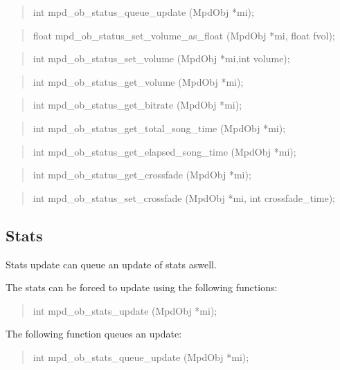 \documentclass[a4paper,11pt]{article}
\begin{document}
	\begin{quote}
	int   mpd\_ob\_status\_queue\_update  (MpdObj *mi);
	\end{quote}
	
	\begin{quote}
	float   mpd\_ob\_status\_set\_volume\_as\_float (MpdObj *mi, float fvol);
	\end{quote}
	
	\begin{quote}
	int   mpd\_ob\_status\_set\_volume  (MpdObj *mi,int volume);
	\end{quote}
	
	\begin{quote}
	int   mpd\_ob\_status\_get\_volume  (MpdObj *mi);
	\end{quote}
	
	\begin{quote}
	int   mpd\_ob\_status\_get\_bitrate  (MpdObj *mi);
	\end{quote}
	
	\begin{quote}
	int  mpd\_ob\_status\_get\_total\_song\_time (MpdObj *mi);
	\end{quote}
	
	\begin{quote}
	int  mpd\_ob\_status\_get\_elapsed\_song\_time (MpdObj *mi);
	\end{quote}
	
	\begin{quote}
	int  mpd\_ob\_status\_get\_crossfade  (MpdObj *mi);
	\end{quote}
	
	\begin{quote}
	int  mpd\_ob\_status\_set\_crossfade  (MpdObj *mi, int crossfade\_time);
	\end{quote}
	
	\subsection {Stats}
	
	
	Stats update can queue an update of stats aswell.
	
	The stats can be forced to update using the following functions:
	
	\begin{quote}
	int  mpd\_ob\_stats\_update   (MpdObj *mi);
	\end{quote}
	
	The following function queues an update:
	\begin{quote}
	int  mpd\_ob\_stats\_queue\_update  (MpdObj *mi);
	\end{quote}
	
\end{document}
